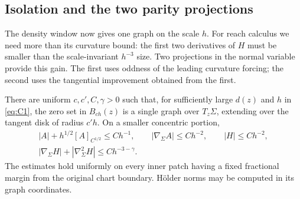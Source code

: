 \subsection{Isolation and the two parity projections}

The density window now gives one graph on the scale $h$.
For reach calculus we need more than its curvature bound: the first
two derivatives of $H$ must be smaller than the scale-invariant
$h^{-3}$ size.  Two projections in the normal variable provide this
gain.  The first uses oddness of the leading curvature forcing; the
second uses the tangential improvement obtained from the first.

\begin{lemma}\label{lem:reach-isolation}
There are uniform $c,c',C,\gamma>0$ such that, for sufficiently
large $d(z)$ and $h$ in \eqref{eq:C1}, the zero set in $B_{ch}(z)$
is a single graph over $T_z\Sigma$, extending over the tangent disk
of radius $c'h$.  On a smaller concentric portion,
\begin{equation}\label{eq:C2}
 \begin{gathered}
 |A|+h^{1/2}[A]_{C^{1/2}}\le C h^{-1},\qquad
 |\nabla_\Sigma A|\le C h^{-2},\qquad |H|\le C h^{-2},\\
 |\nabla_\Sigma H|+|\nabla_\Sigma^2H|\le C h^{-3-\gamma}.
 \end{gathered}
\end{equation}
The estimates hold uniformly on every inner patch having a fixed
fractional margin from the original chart boundary.  Hölder norms
may be computed in its graph coordinates.
\end{lemma}

